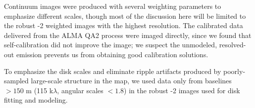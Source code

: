\documentclass[twocolumn]{aastex61}
\let\oldarcsec\arcsec
\renewcommand\arcsec{\oldarcsec\xspace}%
\newcommand{\degrees}{\ensuremath{^{\circ}}}
\begin{document}
Continuum images were produced with several weighting parameters to emphasize
different scales, though most of the discussion here will be limited to the
robust -2 weighted images with the highest resolution.  The calibrated data
delivered from the ALMA QA2 process were imaged directly, since we found
that self-calibration did not improve the image; we suspect the unmodeled, resolved-out
emission prevents us from obtaining good calibration solutions.

To emphasize the disk scales and eliminate ripple artifacts produced by
poorly-sampled large-scale structure in the map, we used data only from baselines
$>150$ m (115 k$\lambda$, angular scales $<1.8$\arcsec) in the robust -2 images
used for disk fitting and modeling.




\end{document}
